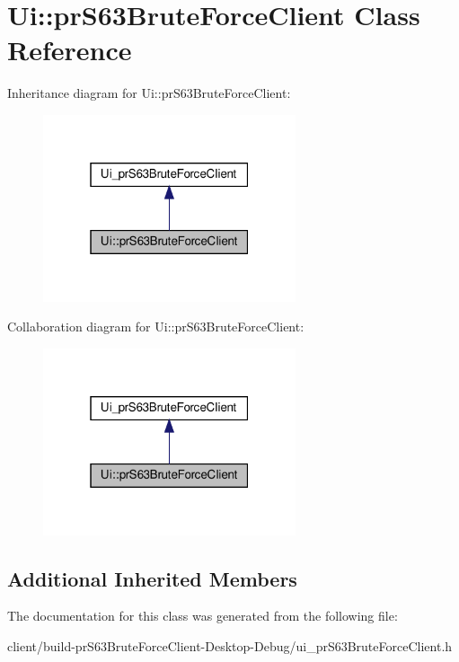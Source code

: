 \hypertarget{class_ui_1_1pr_s63_brute_force_client}{}\section{Ui\+:\+:pr\+S63\+Brute\+Force\+Client Class Reference}
\label{class_ui_1_1pr_s63_brute_force_client}


Inheritance diagram for Ui\+:\+:pr\+S63\+Brute\+Force\+Client\+:
\nopagebreak
\begin{figure}[H]
\begin{center}
\leavevmode
\includegraphics[width=211pt]{class_ui_1_1pr_s63_brute_force_client__inherit__graph}
\end{center}
\end{figure}


Collaboration diagram for Ui\+:\+:pr\+S63\+Brute\+Force\+Client\+:
\nopagebreak
\begin{figure}[H]
\begin{center}
\leavevmode
\includegraphics[width=211pt]{class_ui_1_1pr_s63_brute_force_client__coll__graph}
\end{center}
\end{figure}
\subsection*{Additional Inherited Members}


The documentation for this class was generated from the following file\+:\begin{DoxyCompactItemize}
\item 
client/build-\/pr\+S63\+Brute\+Force\+Client-\/\+Desktop-\/\+Debug/ui\+\_\+pr\+S63\+Brute\+Force\+Client.\+h\end{DoxyCompactItemize}
